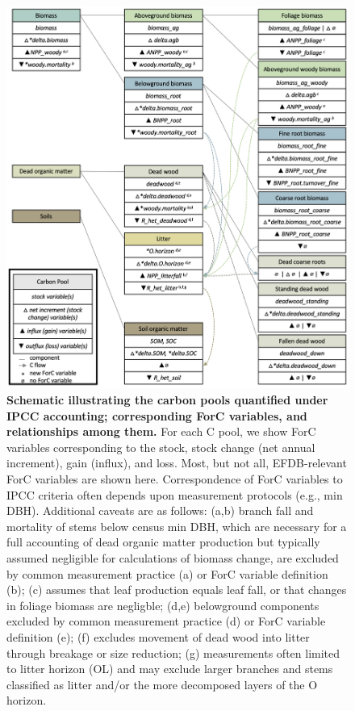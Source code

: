 \documentclass[, manuscript]{copernicus}
\begin{document}
\begin{figure}
\includegraphics[width=14cm]{figures_tables/C_variable_mapping} \caption{\textbf{Schematic illustrating the carbon pools quantified under IPCC accounting; corresponding ForC variables, and relationships among them.} For each C pool, we show ForC variables corresponding to the stock, stock change (net annual increment), gain (influx), and loss. Most, but not all, EFDB-relevant ForC variables are shown here. Correspondence of ForC variables to IPCC criteria often depends upon measurement protocols (e.g., min DBH). Additional caveats are as follows: (a,b) branch fall and mortality of stems below census min DBH, which are necessary for a full accounting of dead organic matter production but typically assumed negligible for calculations of biomass change, are excluded by common measurement practice (a) or ForC variable definition (b); (c) assumes that leaf production equals leaf fall, or that changes in foliage biomass are negligble; (d,e) belowground components excluded by common measurement practice (d) or ForC variable definition (e); (f) excludes movement of dead wood into litter through breakage or size reduction; (g) measurements often limited to litter horizon (OL) and may exclude larger branches and stems classified as litter and/or the more decomposed layers of the O horizon.}\label{fig:fig_variable_mapping}
\end{figure}
\end{document}

